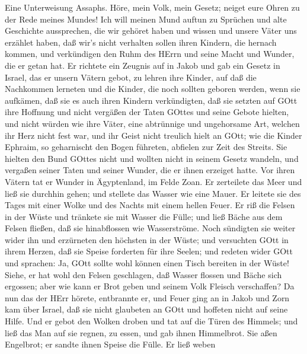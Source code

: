  Eine Unterweisung Assaphs. Höre, mein Volk, mein Gesetz;
neiget eure Ohren zu der Rede meines Mundes!  Ich will
meinen Mund auftun zu Sprüchen und alte Geschichte aussprechen,
 die wir gehöret haben und wissen und unsere Väter uns
erzählet haben,  daß wir's nicht verhalten sollen ihren
Kindern, die hernach kommen, und verkündigen den Ruhm des HErrn und
seine Macht und Wunder, die er getan hat.  Er richtete ein
Zeugnis auf in Jakob und gab ein Gesetz in Israel, das er unsern Vätern
gebot, zu lehren ihre Kinder,  auf daß die Nachkommen
lerneten und die Kinder, die noch sollten geboren werden, wenn sie
aufkämen, daß sie es auch ihren Kindern verkündigten,  daß
sie setzten auf GOtt ihre Hoffnung und nicht vergäßen der Taten GOttes
und seine Gebote hielten,  und nicht würden wie ihre Väter,
eine abtrünnige und ungehorsame Art, welchen ihr Herz nicht fest war,
und ihr Geist nicht treulich hielt an GOtt;  wie die Kinder
Ephraim, so geharnischt den Bogen führeten, abfielen zur Zeit des
Streits.  Sie hielten den Bund GOttes nicht und wollten
nicht in seinem Gesetz wandeln,  und vergaßen seiner Taten
und seiner Wunder, die er ihnen erzeiget hatte.  Vor ihren
Vätern tat er Wunder in Ägyptenland, im Felde Zoan.  Er
zerteilete das Meer und ließ sie durchhin gehen; und stellete das Wasser
wie eine Mauer.  Er leitete sie des Tages mit einer Wolke
und des Nachts mit einem hellen Feuer.  Er riß die Felsen
in der Wüste und tränkete sie mit Wasser die Fülle;  und
ließ Bäche aus dem Felsen fließen, daß sie hinabflossen wie
Wasserströme.  Noch sündigten sie weiter wider ihn und
erzürneten den höchsten in der Wüste;  und versuchten GOtt
in ihrem Herzen, daß sie Speise forderten für ihre Seelen; 
und redeten wider GOtt und sprachen: Ja, GOtt sollte wohl können einen
Tisch bereiten in der Wüste!  Siehe, er hat wohl den Felsen
geschlagen, daß Wasser flossen und Bäche sich ergossen; aber wie kann er
Brot geben und seinem Volk Fleisch verschaffen?  Da nun das
der HErr hörete, entbrannte er, und Feuer ging an in Jakob und Zorn kam
über Israel,  daß sie nicht glaubeten an GOtt und hoffeten
nicht auf seine Hilfe.  Und er gebot den Wolken droben und
tat auf die Türen des Himmels;  und ließ das Man auf sie
regnen, zu essen, und gab ihnen Himmelbrot.  Sie aßen
Engelbrot; er sandte ihnen Speise die Fülle.  Er ließ weben
